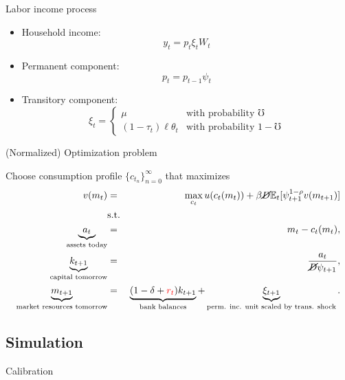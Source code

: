 \documentclass{beamer}
\begin{document}
\small
\begin{frame}{Labor income process}

\begin{itemize}
\item Household income: $$y_t = p_t \xi_t W_t$$
\item Permanent component: $$p_t = p_{t-1} \psi_t$$
\item Transitory component: $$\xi_t =
    \begin{cases}
       \mu & \text{with probability $\mho$} \\
      (1-\tau_t) \ell \theta_t & \text{with probability $1-\mho$}
   \end{cases}$$
\end{itemize}

\end{frame}

\footnotesize
\begin{frame}{(Normalized) Optimization problem}

Choose consumption profile $\{c_{t_n}\}_{n=0}^{\infty}$ that maximizes
 \begin{eqnarray*}
  v(m_t) &=& \max_{c_t} u(c_t(m_t)) + \beta \cancel{D} \mathbb{E}_{t}[\psi_{t+1}^{1-\rho}v(m_{t+1})] \\
  &\text{s.t.}& \\
  \underbrace{a_t}_{\text{assets today}} &=& m_t - c_t(m_t), \\
  \underbrace{k_{t+1}}_{\text{capital tomorrow}} &=& \frac{a_t}{\cancel{D}\psi_{t+1}}, \\
  \underbrace{m_{t+1}}_{\text{market resources tomorrow}} &=& \underbrace{(1 - \delta + \textcolor{red}{r_t})k_{t+1}}_{\text{bank balances}} + \underbrace{\xi_{t+1}}_{\text{perm. inc. unit scaled by trans. shock}}. \\
 \end{eqnarray*}

 


\end{frame}

\subsection{Simulation}

\begin{frame}{Calibration}
\vfill
\begin{table}
  \centering
  
\end{table}
\vfill
\end{frame}
\end{document}
